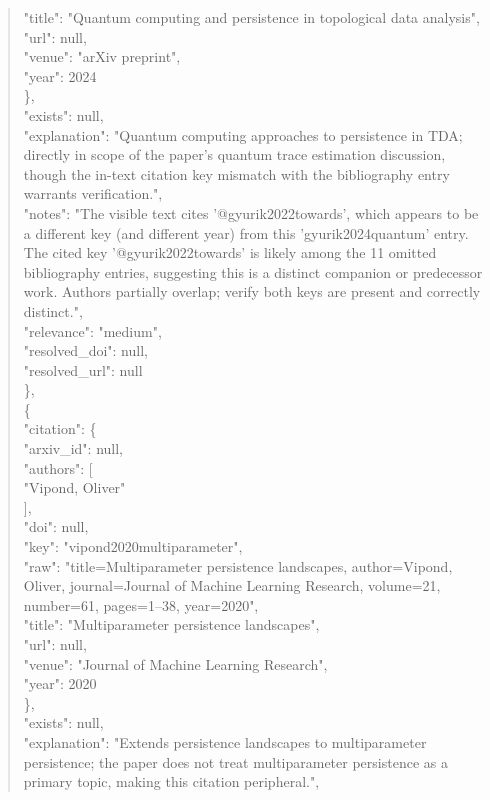 \documentclass[11pt]{article}
\begin{document}
\begin{quote}
        "title": "Quantum computing and persistence in topological data analysis",\\
        "url": null,\\
        "venue": "arXiv preprint",\\
        "year": 2024\\
      \},\\
      "exists": null,\\
      "explanation": "Quantum computing approaches to persistence in TDA; directly in scope of the paper's quantum trace estimation discussion, though the in-text citation key mismatch with the bibliography entry warrants verification.",\\
      "notes": "The visible text cites '@gyurik2022towards', which appears to be a different key (and different year) from this 'gyurik2024quantum' entry. The cited key '@gyurik2022towards' is likely among the 11 omitted bibliography entries, suggesting this is a distinct companion or predecessor work. Authors partially overlap; verify both keys are present and correctly distinct.",\\
      "relevance": "medium",\\
      "resolved\_doi": null,\\
      "resolved\_url": null\\
    \},\\
    \{\\
      "citation": \{\\
        "arxiv\_id": null,\\
        "authors": [\\
          "Vipond, Oliver"\\
        ],\\
        "doi": null,\\
        "key": "vipond2020multiparameter",\\
        "raw": "title=Multiparameter persistence landscapes, author=Vipond, Oliver, journal=Journal of Machine Learning Research, volume=21, number=61, pages=1--38, year=2020",\\
        "title": "Multiparameter persistence landscapes",\\
        "url": null,\\
        "venue": "Journal of Machine Learning Research",\\
        "year": 2020\\
      \},\\
      "exists": null,\\
      "explanation": "Extends persistence landscapes to multiparameter persistence; the paper does not treat multiparameter persistence as a primary topic, making this citation peripheral.",\\

\end{quote}
\end{document}
